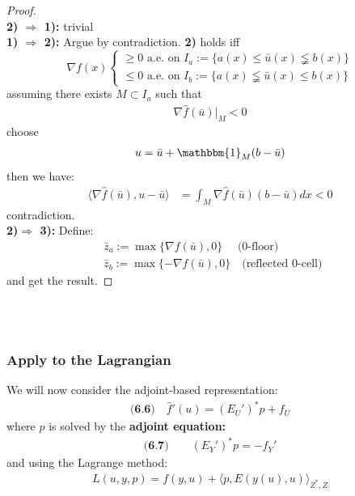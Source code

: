 \begin{proof}
\quad\\
\textbf{2) $\Rightarrow$ 1):} trivial\\
\textbf{1) $\Rightarrow$ 2):} Argue by contradiction. \textbf{2)} holds iff
\begin{equation*}
\nabla f(x)\left\{
\begin{aligned}
	\ge 0 \text{ a.e. on  } I_a := \{a(x) \le \bar{u}(x) \lneqq b(x)\}\\
	\le 0 \text{ a.e. on  } I_b := \{a(x) \lneqq \bar{u}(x) \le b(x) \}
\end{aligned}
\right.	
\end{equation*}
assuming there exists $M \subset I_a$ such that 
\begin{align*}
	\nabla \hat{f}(\bar{u})|_M <  0
\end{align*}
choose 
\begin{align*}
	u = \bar{u} + \mathbbm{1}_{M}(b - \bar{u})
\end{align*}
then we have:
\begin{align*}
	\langle \nabla \hat{f}(\bar{u}), u - \bar{u} \rangle 
	&= \int_M \nabla \hat{f} (\bar{u})(b - \bar{u}) dx < 0
\end{align*}
contradiction. \\
\textbf{2)$\Rightarrow$ 3):} Define:
\begin{align*}
	&\bar{z}_a:= \max\{\nabla f(\bar{u}), 0 \}\quad \text{ (0-floor)} \\
	&\bar{z}_b:= \max\{-\nabla f(\bar{u}), 0\}\quad \text{(reflected 0-cell) }
\end{align*}
and get the result. 
\end{proof}

\quad\\
\quad\\
\subsubsection*{Apply to the Lagrangian}
We will now consider the adjoint-based representation: 
\begin{align*}
\textbf{(6.6)} \quad
	\hat{f}'(u) = (E_U')^* p + f_U
\end{align*}
where $p$ is solved by the \textbf{adjoint equation:} 
\begin{align*}
\textbf{(6.7)}
\qquad
	(E_Y')^* p = -f_Y'
\end{align*}
and using the Lagrange method:
\begin{align*}
	L(u, y, p) = f(y, u) + \langle p, E(y(u), u) \rangle_{Z^*, Z}
\end{align*}

